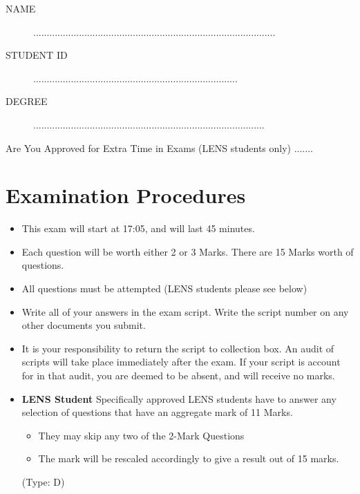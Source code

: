 \documentclass[11pt]{article} %
\begin{document}
	
	
	\Large
\newpage

\begin{framed}
\begin{description}
\item[NAME]  ..........................................................................................
\bigskip
\item[STUDENT ID] ............................................................................
\bigskip
\item[DEGREE] ......................................................................................
\end{description}
\end{framed}
\noindent Are You Approved for Extra Time in Exams (LENS students only)  .......
\section*{Examination Procedures}

\begin{itemize} 
	\item This exam will start at 17:05, and will last 45 minutes.
	
	\item Each question will be worth either 2 or 3 Marks. There are 15 Marks worth of questions.
	\item All questions must be attempted (LENS students please see below)
	
	\item Write all of your answers in the exam script. Write the script number on any other documents you submit.
	
	\item It is your responsibility to return the script to collection box. An audit of scripts will take place immediately after the exam. If your script is account for in that audit,  you are deemed to be absent, and will receive no marks.
	
	\item \textbf{LENS Student}
	Specifically approved LENS students have to answer any selection of questions that have an aggregate mark of 11 Marks.  
	\begin{itemize}
		\item They may skip any two of the 2-Mark Questions
		\item The mark will be rescaled accordingly to give a result out of 15 marks.
	\end{itemize}
	
(Type: D)	
\end{itemize}
\end{document}
